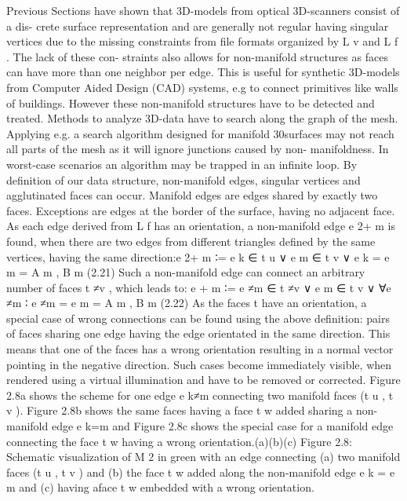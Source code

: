 Previous Sections have shown that 3D-models from optical 3D-scanners consist of a dis-
crete surface representation and are generally not regular having singular vertices due to
the missing constraints from file formats organized by L v and L f . The lack of these con-
straints also allows for non-manifold structures as faces can have more than one neighbor
per edge. This is useful for synthetic 3D-models from Computer Aided Design (CAD)
systems, e.g to connect primitives like walls of buildings. However these non-manifold
structures have to be detected and treated. Methods to analyze 3D-data have to search
along the graph of the mesh. Applying e.g. a search algorithm designed for manifold
30surfaces may not reach all parts of the mesh as it will ignore junctions caused by non-
manifoldness. In worst-case scenarios an algorithm may be trapped in an infinite loop. By
definition of our data structure, non-manifold edges, singular vertices and agglutinated
faces can occur.
Manifold edges are edges shared by exactly two faces. Exceptions are edges at the
border of the surface, having no adjacent face. As each edge derived from L f has an
orientation, a non-manifold edge e 2+
m is found, when there are two edges from different
triangles defined by the same vertices, having the same direction:e 2+
m ∶= e k ∈ t u ∨ e m ∈ t v ∨ e k = e m = {A m , B m }(2.21)
Such a non-manifold edge can connect an arbitrary number of faces t ≠v , which leads to:
e + m ∶= e ≠m ∈ t ≠v ∨ e m ∈ t v ∨ ∀e ≠m ∶ e ≠m = e m = {A m , B m }(2.22)
As the faces t have an orientation, a special case of wrong connections can be found
using the above definition: pairs of faces sharing one edge having the edge orientated in
the same direction. This means that one of the faces has a wrong orientation resulting
in a normal vector pointing in the negative direction. Such cases become immediately
visible, when rendered using a virtual illumination and have to be removed or corrected.
Figure 2.8a shows the scheme for one edge e k≠m connecting two manifold faces (t u , t v ).
Figure 2.8b shows the same faces having a face t w added sharing a non-manifold edge
e k=m and Figure 2.8c shows the special case for a manifold edge connecting the face t w
having a wrong orientation.(a)(b)(c)
Figure 2.8: Schematic visualization of M 2 in green with an edge connecting (a) two manifold
faces (t u , t v ) and (b) the face t w added along the non-manifold edge e k = e m and 
(c) having aface t w embedded with a wrong orientation.~\cite[p.~30-31]{Mara12}


